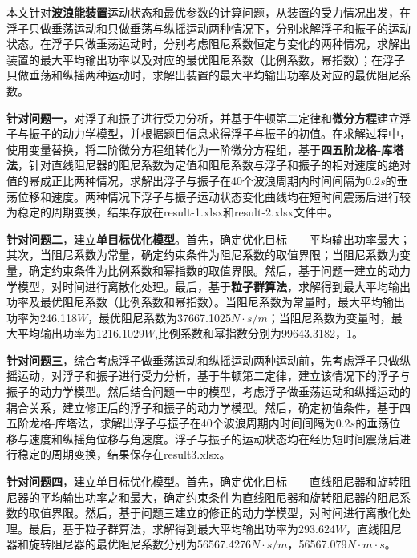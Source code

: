 \documentclass{my_paper}
\begin{document}
\newpage

\begin{center}
\lunwenbiaoti

\vspace{2ex}
\zhaiyao
\end{center}

本文针对\textbf{波浪能装置}运动状态和最优参数的计算问题，从装置的受力情况出发，在浮子只做垂荡运动和只做垂荡与纵摇运动两种情况下，分别求解浮子和振子的运动状态。在浮子只做垂荡运动时，分别考虑阻尼系数恒定与变化的两种情况，求解出装置的最大平均输出功率以及对应的最优阻尼系数（比例系数，幂指数）；在浮子只做垂荡和纵摇两种运动时，求解出装置的最大平均输出功率及对应的最优阻尼系数。



\textbf{针对问题一}，对浮子和振子进行受力分析，并基于牛顿第二定律和\textbf{微分方程}建立浮子与振子的动力学模型，并根据题目信息求得浮子与振子的初值。在求解过程中，使用变量替换，将二阶微分方程组转化为一阶微分方程组，基于\textbf{四五阶龙格-库塔法}，针对直线阻尼器的阻尼系数为定值和阻尼系数与浮子和振子的相对速度的绝对值的幂成正比两种情况，求解出浮子与振子在40个波浪周期内时间间隔为0.2$s$的垂荡位移和速度。两种情况下浮子与振子运动状态变化曲线均在短时间震荡后进行较为稳定的周期变换，结果存放在result-1.xlsx和result-2.xlsx文件中。

\textbf{针对问题二}，建立\textbf{单目标优化模型}。首先，确定优化目标——平均输出功率最大；其次，当阻尼系数为常量，确定约束条件为阻尼系数的取值界限；当阻尼系数为变量，确定约束条件为比例系数和幂指数的取值界限。然后，基于问题一建立的动力学模型，对时间进行离散化处理。最后，基于\textbf{粒子群算法}，求解得到最大平均输出功率及最优阻尼系数（比例系数和幂指数）。当阻尼系数为常量时，最大平均输出功率为246.118$W$，最优阻尼系数为37667.1025$N\cdot s/m$；当阻尼系数为变量时，最大平均输出功率为1216.1029$W$,比例系数和幂指数分别为99643.3182，1。


\textbf{针对问题三}，综合考虑浮子做垂荡运动和纵摇运动两种运动前，先考虑浮子只做纵摇运动，对浮子和振子进行受力分析，基于牛顿第二定律，建立该情况下的浮子与振子的动力学模型。然后结合问题一中的模型，考虑浮子做垂荡运动和纵摇运动的耦合关系，建立修正后的浮子和振子的动力学模型。然后，确定初值条件，基于四五阶龙格-库塔法，求解出浮子与振子在40个波浪周期内时间间隔为0.2$s$的垂荡位移与速度和纵摇角位移与角速度。浮子与振子的运动状态均在经历短时间震荡后进行稳定的周期变换，结果保存在result3.xlsx。

\textbf{针对问题四}，建立单目标优化模型。首先，确定优化目标——直线阻尼器和旋转阻尼器的平均输出功率之和最大，确定约束条件为直线阻尼器和旋转阻尼器的阻尼系数的取值界限。然后，基于问题三建立的修正的动力学模型，对时间进行离散化处理。最后，基于粒子群算法，求解得到最大平均输出功率为293.624$W$，直线阻尼器和旋转阻尼器的最优阻尼系数分别为56567.4276$N\cdot s/m$，56567.079$N\cdot m \cdot s$。
\end{document}
